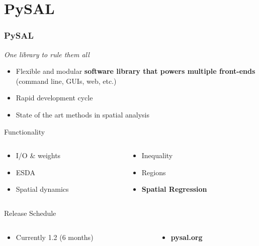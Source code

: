 \documentclass[nototal]{beamer}
\begin{document}
\section{PySAL} 

\begin{frame}
	\frametitle{PySAL}
 \begin{center}
 \textit{One library to rule them all}
 \end{center}
 \begin{itemize}
 \item  Flexible and modular \textbf{software library that powers multiple front-ends} (command line, GUIs, web, etc.)
 \item  Rapid development cycle
 \item  State of the art methods in spatial analysis
 \end{itemize}
 
\begin{block}{Functionality}
  \begin{columns}
  \begin{column}{0.5\linewidth}
  \begin{itemize}
  \item I/O \& weights
  \item ESDA
  \item Spatial dynamics
  \end{itemize}
  \end{column}
  \begin{column}{0.5\linewidth}
  \begin{itemize}
  \item Inequality
  \item Regions
  \item \textbf{Spatial Regression}
  \end{itemize}
  \end{column}
  \end{columns}		
 \end{block} 
\begin{block}{Release Schedule}
  \begin{columns}		
  \begin{column}{0.5\linewidth}
  \begin{itemize}
  \item Currently 1.2 (6 months)
  \end{itemize}
  \end{column}
  \begin{column}{0.5\linewidth}
 \begin{itemize}
 \item  \begin{large}\textbf{pysal.org}\end{large}
 \end{itemize}
  \end{column}
  \end{columns}		
 \end{block} \end{frame} 
\end{document}

